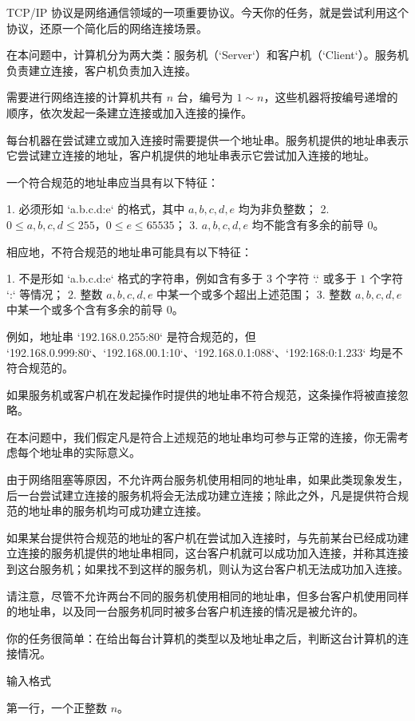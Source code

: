 \documentclass[12pt,twiside,a4paper]{ctexbook}
\numberwithin{chapter}{part}
\begin{document}
TCP/IP 协议是网络通信领域的一项重要协议。今天你的任务，就是尝试利用这个协议，还原一个简化后的网络连接场景。

在本问题中，计算机分为两大类：服务机（`Server`）和客户机（`Client`）。服务机负责建立连接，客户机负责加入连接。

需要进行网络连接的计算机共有 $n$ 台，编号为 $1 \sim n$，这些机器将按编号递增的顺序，依次发起一条建立连接或加入连接的操作。

每台机器在尝试建立或加入连接时需要提供一个地址串。服务机提供的地址串表示它尝试建立连接的地址，客户机提供的地址串表示它尝试加入连接的地址。

一个符合规范的地址串应当具有以下特征：

1. 必须形如 `a.b.c.d:e` 的格式，其中 $a, b, c, d, e$ 均为非负整数；
2. $0 \le a, b, c, d \le 255$，$0 \le e \le 65535$；
3. $a, b, c, d, e$ 均不能含有多余的前导 $0$。

相应地，不符合规范的地址串可能具有以下特征：

1. 不是形如 `a.b.c.d:e` 格式的字符串，例如含有多于 $3$ 个字符 `.` 或多于 $1$ 个字符 `:` 等情况；
2. 整数 $a, b, c, d, e$ 中某一个或多个超出上述范围；
3. 整数 $a, b, c, d, e$ 中某一个或多个含有多余的前导 $0$。

例如，地址串 `192.168.0.255:80` 是符合规范的，但 `192.168.0.999:80`、`192.168.00.1:10`、`192.168.0.1:088`、`192:168:0:1.233` 均是不符合规范的。

如果服务机或客户机在发起操作时提供的地址串不符合规范，这条操作将被直接忽略。

在本问题中，我们假定凡是符合上述规范的地址串均可参与正常的连接，你无需考虑每个地址串的实际意义。

由于网络阻塞等原因，不允许两台服务机使用相同的地址串，如果此类现象发生，后一台尝试建立连接的服务机将会无法成功建立连接；除此之外，凡是提供符合规范的地址串的服务机均可成功建立连接。

如果某台提供符合规范的地址的客户机在尝试加入连接时，与先前某台已经成功建立连接的服务机提供的地址串相同，这台客户机就可以成功加入连接，并称其连接到这台服务机；如果找不到这样的服务机，则认为这台客户机无法成功加入连接。

请注意，尽管不允许两台不同的服务机使用相同的地址串，但多台客户机使用同样的地址串，以及同一台服务机同时被多台客户机连接的情况是被允许的。

你的任务很简单：在给出每台计算机的类型以及地址串之后，判断这台计算机的连接情况。

 输入格式

第一行，一个正整数 $n$。
\end{document}
